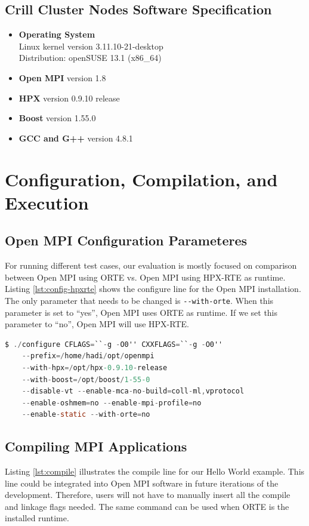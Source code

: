 \subsection{Crill Cluster Nodes Software Specification}
\begin{itemize}
\item \textbf{Operating System}\\
  Linux kernel version 3.11.10-21-desktop\\
  Distribution: openSUSE 13.1 (x86\_64)
\item \textbf{Open MPI} version 1.8
\item \textbf{HPX} version 0.9.10 release
\item \textbf{Boost} version 1.55.0
\item \textbf{GCC and G++} version 4.8.1
\end{itemize}


\section{Configuration, Compilation, and Execution}

\subsection{Open MPI Configuration Parameteres}
For running different test cases, our evaluation is mostly focused on comparison between Open MPI using ORTE vs. Open MPI using HPX-RTE as runtime.
Listing \ref{lst:config-hpxrte} shows the configure line for the Open MPI installation. The only parameter that needs to be changed is \verb|--with-orte|. When this parameter is set to ``yes'', Open MPI uses ORTE as runtime. If we set this parameter to ``no'', Open MPI will use HPX-RTE.

\begin{lstlisting}[language=C, frame=single, basicstyle=\footnotesize, caption=Configure Line of Open MPI with HPX-RTE\label{lst:config-hpxrte}]
  $ ./configure CFLAGS=``-g -O0'' CXXFLAGS=``-g -O0''
    --prefix=/home/hadi/opt/openmpi
    --with-hpx=/opt/hpx-0.9.10-release
    --with-boost=/opt/boost/1-55-0
    --disable-vt --enable-mca-no-build=coll-ml,vprotocol
    --enable-oshmem=no --enable-mpi-profile=no
    --enable-static --with-orte=no
\end{lstlisting}

\subsection{Compiling MPI Applications}
Listing \ref{lst:compile} illustrates the compile line for our Hello World example. This line could be integrated into Open MPI software in future iterations of the development. Therefore, users will not have to manually insert all the compile and linkage flags needed. The same command can be used when ORTE is the installed runtime.

